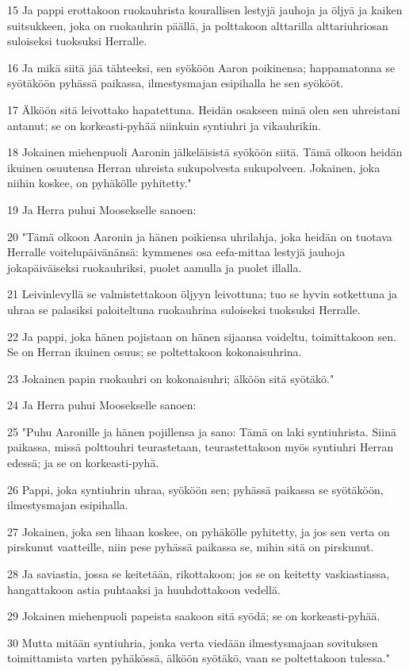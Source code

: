 \par 15 Ja pappi erottakoon ruokauhrista kourallisen lestyjä jauhoja ja öljyä ja kaiken suitsukkeen, joka on ruokauhrin päällä, ja polttakoon alttarilla alttariuhriosan suloiseksi tuoksuksi Herralle.
\par 16 Ja mikä siitä jää tähteeksi, sen syököön Aaron poikinensa; happamatonna se syötäköön pyhässä paikassa, ilmestysmajan esipihalla he sen syökööt.
\par 17 Älköön sitä leivottako hapatettuna. Heidän osakseen minä olen sen uhreistani antanut; se on korkeasti-pyhää niinkuin syntiuhri ja vikauhrikin.
\par 18 Jokainen miehenpuoli Aaronin jälkeläisistä syököön siitä. Tämä olkoon heidän ikuinen osuutensa Herran uhreista sukupolvesta sukupolveen. Jokainen, joka niihin koskee, on pyhäkölle pyhitetty."
\par 19 Ja Herra puhui Moosekselle sanoen:
\par 20 "Tämä olkoon Aaronin ja hänen poikiensa uhrilahja, joka heidän on tuotava Herralle voitelupäivänänsä: kymmenes osa eefa-mittaa lestyjä jauhoja jokapäiväiseksi ruokauhriksi, puolet aamulla ja puolet illalla.
\par 21 Leivinlevyllä se valmistettakoon öljyyn leivottuna; tuo se hyvin sotkettuna ja uhraa se palasiksi paloiteltuna ruokauhrina suloiseksi tuoksuksi Herralle.
\par 22 Ja pappi, joka hänen pojistaan on hänen sijaansa voideltu, toimittakoon sen. Se on Herran ikuinen osuus; se poltettakoon kokonaisuhrina.
\par 23 Jokainen papin ruokauhri on kokonaisuhri; älköön sitä syötäkö."
\par 24 Ja Herra puhui Moosekselle sanoen:
\par 25 "Puhu Aaronille ja hänen pojillensa ja sano: Tämä on laki syntiuhrista. Siinä paikassa, missä polttouhri teurastetaan, teurastettakoon myös syntiuhri Herran edessä; ja se on korkeasti-pyhä.
\par 26 Pappi, joka syntiuhrin uhraa, syököön sen; pyhässä paikassa se syötäköön, ilmestysmajan esipihalla.
\par 27 Jokainen, joka sen lihaan koskee, on pyhäkölle pyhitetty, ja jos sen verta on pirskunut vaatteille, niin pese pyhässä paikassa se, mihin sitä on pirskunut.
\par 28 Ja saviastia, jossa se keitetään, rikottakoon; jos se on keitetty vaskiastiassa, hangattakoon astia puhtaaksi ja huuhdottakoon vedellä.
\par 29 Jokainen miehenpuoli papeista saakoon sitä syödä; se on korkeasti-pyhää.
\par 30 Mutta mitään syntiuhria, jonka verta viedään ilmestysmajaan sovituksen toimittamista varten pyhäkössä, älköön syötäkö, vaan se poltettakoon tulessa."


